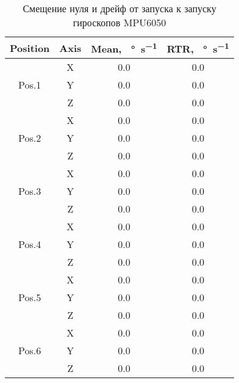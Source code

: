\begin{table}[h!]
	\centering
	\caption{Смещение нуля и дрейф от запуска к запуску гироскопов MPU6050}
	\begin{tabular}{|c|c|c|c|}
	\hline
	Position & Axis & Mean, \SI[per-mode=symbol]{}{\degree\per\second} & RTR, \SI[per-mode=symbol]{}{\degree\per\second} \\ \hline
	\multirow{3}{*}{Pos.1}	& X & 0.0 & 0.0 \\												 
							\cline{2-4}
							& Y & 0.0 & 0.0 \\												 
							\cline{2-4}
							& Z & 0.0 & 0.0 \\												 
	\hline
	\multirow{3}{*}{Pos.2}	& X & 0.0 & 0.0 \\												 
							\cline{2-4}
							& Y & 0.0 & 0.0 \\												 
							\cline{2-4}
							& Z & 0.0 & 0.0 \\												 
	\hline	
	\multirow{3}{*}{Pos.3}	& X & 0.0 & 0.0 \\												 
							\cline{2-4}
							& Y & 0.0 & 0.0 \\												 
							\cline{2-4}
							& Z & 0.0 & 0.0 \\												 
	\hline
	\multirow{3}{*}{Pos.4}	& X & 0.0 & 0.0 \\												 
							\cline{2-4}
							& Y & 0.0 & 0.0 \\												 
							\cline{2-4}
							& Z & 0.0 & 0.0 \\												 
	\hline
	\multirow{3}{*}{Pos.5}	& X & 0.0 & 0.0 \\												 
							\cline{2-4}
							& Y & 0.0 & 0.0 \\												 
							\cline{2-4}
							& Z & 0.0 & 0.0 \\												 
	\hline
	\multirow{3}{*}{Pos.6}	& X & 0.0 & 0.0 \\												 
							\cline{2-4}
							& Y & 0.0 & 0.0 \\												 
							\cline{2-4}
							& Z & 0.0 & 0.0 \\												 
	\hline
	\end{tabular}
	\label{table:gyr_rtr}
\end{table}





